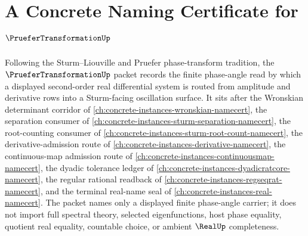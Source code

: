 \chapter{A Concrete Naming Certificate for $\PrueferTransformationUp$}
\label{ch:concrete-instances-pruefer-transformation-namecert}

Following the Sturm--Liouville and Pruefer phase-transform tradition, the $\PrueferTransformationUp$ packet records the finite phase-angle read by which a displayed second-order real differential system is routed from amplitude and derivative rows into a Sturm-facing oscillation surface. It sits after the Wronskian determinant corridor of \autoref{ch:concrete-instances-wronskian-namecert}, the separation consumer of \autoref{ch:concrete-instances-sturm-separation-namecert}, the root-counting consumer of \autoref{ch:concrete-instances-sturm-root-count-namecert}, the derivative-admission route of \autoref{ch:concrete-instances-derivative-namecert}, the continuous-map admission route of \autoref{ch:concrete-instances-continuousmap-namecert}, the dyadic tolerance ledger of \autoref{ch:concrete-instances-dyadicratcore-namecert}, the regular rational readback of \autoref{ch:concrete-instances-regseqrat-namecert}, and the terminal real-name seal of \autoref{ch:concrete-instances-real-namecert}. The packet names only a displayed finite phase-angle carrier; it does not import full spectral theory, selected eigenfunctions, host phase equality, quotient real equality, countable choice, or ambient $\RealUp$ completeness.

